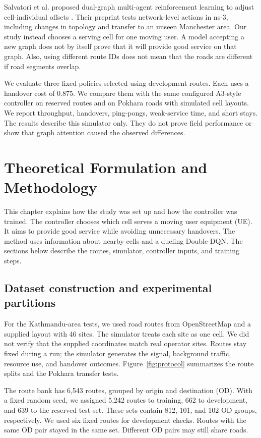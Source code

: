 \documentclass[fleqn,10pt,twoside]{IOEGC}
\begin{document}
Salvatori et al. proposed dual-graph multi-agent reinforcement learning to adjust cell-individual offsets \cite{salvatori2026}. Their preprint tests network-level actions in ns-3, including changes in topology and transfer to an unseen Manchester area. Our study instead chooses a serving cell for one moving user. A model accepting a new graph does not by itself prove that it will provide good service on that graph. Also, using different route IDs does not mean that the roads are different if road segments overlap.

We evaluate three fixed policies selected using development routes. Each uses a handover cost of 0.875. We compare them with the same configured A3-style controller on reserved routes and on Pokhara roads with simulated cell layouts. We report throughput, handovers, ping-pongs, weak-service time, and short stays. The results describe this simulator only. They do not prove field performance or show that graph attention caused the observed differences.

\section{Theoretical Formulation and Methodology}
This chapter explains how the study was set up and how the controller was trained. The controller chooses which cell serves a moving user equipment (UE). It aims to provide good service while avoiding unnecessary handovers. The method uses information about nearby cells and a dueling Double-DQN. The sections below describe the routes, simulator, controller inputs, and training steps.

\subsection{Dataset construction and experimental partitions}
For the Kathmandu-area tests, we used road routes from OpenStreetMap \cite{osm} and a supplied layout with 46 sites. The simulator treats each site as one cell. We did not verify that the supplied coordinates match real operator sites. Routes stay fixed during a run; the simulator generates the signal, background traffic, resource use, and handover outcomes. Figure~\ref{fig:protocol} summarizes the route splits and the Pokhara transfer tests.

The route bank has 6,543 routes, grouped by origin and destination (OD). With a fixed random seed, we assigned 5,242 routes to training, 662 to development, and 639 to the reserved test set. These sets contain 812, 101, and 102 OD groups, respectively. We used six fixed routes for development checks. Routes with the same OD pair stayed in the same set. Different OD pairs may still share roads.
\end{document}
